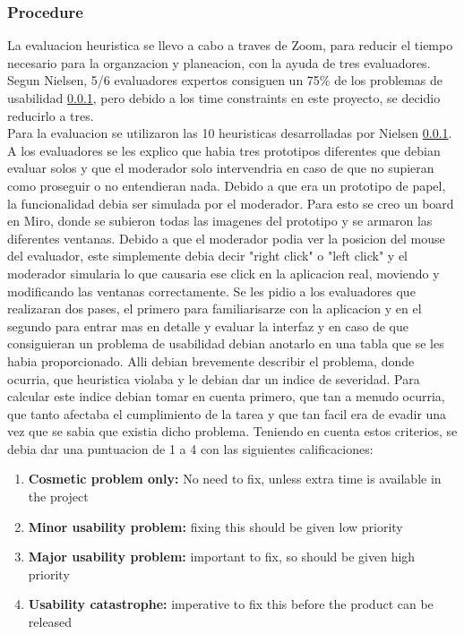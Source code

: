 \subsubsection{Procedure}
La evaluacion heuristica se llevo a cabo a traves de Zoom, para reducir el tiempo necesario para la organzacion y planeacion, con la ayuda de tres evaluadores. Segun Nielsen, 5/6 evaluadores expertos consiguen un 75\% de los problemas de usabilidad \ref{}, pero debido a los time constraints en este proyecto, se decidio reducirlo a tres.\\
Para la evaluacion se utilizaron las 10 heuristicas desarrolladas por Nielsen \ref{}. A los evaluadores se les explico que habia tres prototipos diferentes que debian evaluar solos y que el moderador solo intervendria en caso de que no supieran como proseguir o no entendieran nada. Debido a que era un prototipo de papel, la funcionalidad debia ser simulada por el moderador. Para esto se creo un board en Miro, donde se subieron todas las imagenes del prototipo y se armaron las diferentes ventanas. Debido a que el moderador podia ver la posicion del mouse del evaluador, este simplemente debia decir "right click" o "left click" y el moderador simularia lo que causaria ese click en la aplicacion real, moviendo y modificando las ventanas correctamente. Se les pidio a los evaluadores que realizaran dos pases, el primero para familiarisarze con la aplicacion y en el segundo para entrar mas en detalle y evaluar la interfaz y en caso de que consiguieran un problema de usabilidad debian anotarlo en una tabla que se les habia proporcionado. Alli debian brevemente describir el problema, donde ocurria, que heuristica violaba y le debian dar un indice de severidad. Para calcular este indice debian tomar en cuenta primero, que tan a menudo ocurria, que tanto afectaba el cumplimiento de la tarea y que tan facil era de evadir una vez que se sabia que existia dicho problema. Teniendo en cuenta estos criterios, se debia dar una puntuacion de 1 a 4 con las siguientes calificaciones: 

\begin{enumerate}
    \item \textbf{Cosmetic problem only:} No need to fix, unless extra time is available in the project
    \item \textbf{Minor usability problem:} fixing this should be given low priority
    \item \textbf{Major usability problem:} important to fix, so should be given high priority
    \item \textbf{Usability catastrophe:} imperative to fix this before the product can be released
\end{enumerate}

